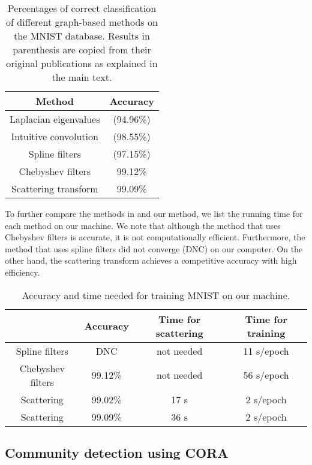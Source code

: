 \documentclass{article}
\begin{document}
\begin{table}[!ht]
\centering
\begin{tabular}{|c|c|}
\hline
Method & Accuracy \\
\hline
 Laplacian eigenvalues \cite{EdwX16} & (94.96\%) \\
\hline
 Intuitive convolution \cite{HecCQ17} & (98.55\%) \\
\hline
 Spline filters \cite{DefBV16} & {(97.15\%)} \\
\hline
 Chebyshev filters \cite{DefBV16} & {99.12}\% \\
 \hline
Scattering transform &  {99.09}\% \\
\hline
\end{tabular}
\caption{Percentages of correct classification of different graph-based methods on the MNIST database. 
{Results in parenthesis are copied from their original publications as explained in the main text.}}
\label{tab:mnistcpr}
\end{table}

{To further compare the methods in \cite{DefBV16} and our method, we list the running time for each method on our machine. We note that although the method that uses Chebyshev filters is accurate, it is not computationally efficient. Furthermore, the method that uses spline filters did not converge (DNC) on our computer. On the other hand, the scattering transform achieves a competitive accuracy with high efficiency. }

\begin{table}[!ht]
\centering
\begin{tabular}{|c|c|c|c|}
\hline
~ & Accuracy & Time for scattering & Time for training \\
\hline
Spline filters  & DNC & not needed & 11 s/epoch \\
\hline
Chebyshev filters  & 99.12\% & not needed & 56 s/epoch \\
\hline
Scattering  & 99.02\% & 17 s & 2 s/epoch \\
\hline
Scattering  & 99.09\% & 36 s & 2 s/epoch \\
\hline
\end{tabular}
\caption{Accuracy and time needed for training MNIST on our machine.  }
\label{tab:mnisttime}
\end{table}

\subsection{Community detection using CORA}\label{sec:SBM}
\end{document}
